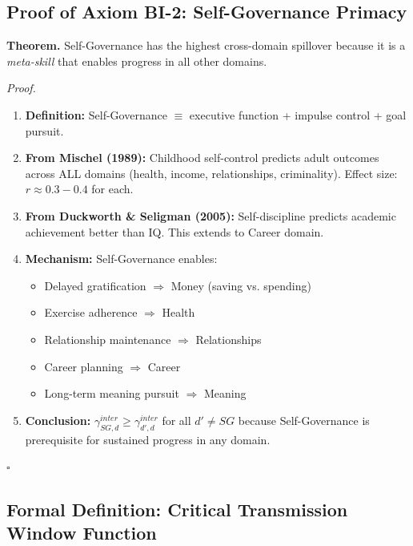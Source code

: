 \subsection{Proof of Axiom BI-2: Self-Governance Primacy}

\begin{tcolorbox}[colback=green!5!white, colframe=green!75!black, title=Theorem BI-T2: Self-Governance Primacy]
\textbf{Theorem.} Self-Governance has the highest cross-domain spillover because it is a
\textit{meta-skill} that enables progress in all other domains.

\textit{Proof.}
\begin{enumerate}
\item \textbf{Definition:} Self-Governance $\equiv$ executive function + impulse control + goal pursuit.

\item \textbf{From Mischel (1989):} Childhood self-control predicts adult outcomes across ALL domains
      (health, income, relationships, criminality). Effect size: $r \approx 0.3-0.4$ for each.

\item \textbf{From Duckworth \& Seligman (2005):} Self-discipline predicts academic achievement
      better than IQ. This extends to Career domain.

\item \textbf{Mechanism:} Self-Governance enables:
      \begin{itemize}[nosep]
      \item Delayed gratification $\Rightarrow$ Money (saving vs. spending)
      \item Exercise adherence $\Rightarrow$ Health
      \item Relationship maintenance $\Rightarrow$ Relationships
      \item Career planning $\Rightarrow$ Career
      \item Long-term meaning pursuit $\Rightarrow$ Meaning
      \end{itemize}

\item \textbf{Conclusion:} $\gamma^{inter}_{SG,d} \geq \gamma^{inter}_{d',d}$ for all $d' \neq SG$ because
      Self-Governance is prerequisite for sustained progress in any domain.
\end{enumerate}
\hfill $\square$
\end{tcolorbox}

\subsection{Formal Definition: Critical Transmission Window Function}

